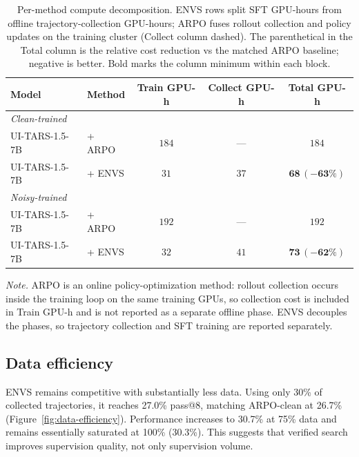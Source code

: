 \documentclass[11pt]{article}
\begin{document}
\begin{table}[H]
  \caption{Per-method compute decomposition. ENVS rows split SFT
  GPU-hours from offline trajectory-collection GPU-hours; ARPO fuses
  rollout collection and policy updates on the training cluster (Collect
  column dashed). The parenthetical in the Total column is the relative
  cost reduction vs the matched ARPO baseline; negative is better.
  Bold marks the column minimum within each block.}
  \label{tab:compute}
  \centering
  \small
  \begin{tabular}{llccc}
    \toprule
    Model           & Method           & Train GPU-h & Collect GPU-h & Total GPU-h                 \\
    \midrule
    \multicolumn{5}{l}{\textit{Clean-trained}} \\
    UI-TARS-1.5-7B  & + ARPO           & $184$       & ---           & $184$                       \\
    UI-TARS-1.5-7B  & + ENVS           & $31$        & $37$          & $\mathbf{68\,(-63\%)}$      \\
    \midrule
    \multicolumn{5}{l}{\textit{Noisy-trained}} \\
    UI-TARS-1.5-7B  & + ARPO           & $192$       & ---           & $192$                       \\
    UI-TARS-1.5-7B  & + ENVS           & $32$        & $41$          & $\mathbf{73\,(-62\%)}$      \\
    \bottomrule
  \end{tabular}

  \vspace{0.9em}
  \begin{minipage}{0.92\linewidth}
  \footnotesize
  \emph{Note.} ARPO is an online policy-optimization method: rollout collection occurs inside the training loop on the same training GPUs, so collection cost is included in Train GPU-h and is not reported as a separate offline phase. ENVS decouples the phases, so trajectory collection and SFT training are reported separately.
  \end{minipage}
\end{table}


\subsection{Data efficiency}
ENVS remains competitive with substantially less data. Using only 30\%
of collected trajectories, it reaches 27.0\% pass@8, matching ARPO-clean
at 26.7\% (Figure~\ref{fig:data-efficiency}). Performance increases to
30.7\% at 75\% data and remains essentially saturated at 100\%
(30.3\%). This suggests that verified search improves supervision
quality, not only supervision volume.
\end{document}
